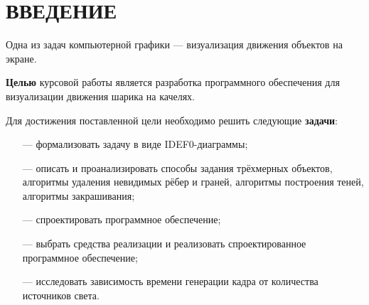 \chapter*{ВВЕДЕНИЕ}

\fontsize{16}{19}\selectfont

Одна из задач компьютерной графики --- визуализация движения объектов на экране.

\textbf{Целью} курсовой работы является разработка программного обеспечения для визуализации движения шарика на качелях.

Для достижения поставленной цели необходимо решить следующие \textbf{задачи}:

\begin{enumerate}
	\item[---] формализовать задачу в виде IDEF0-диаграммы;
	\item[---] описать и проанализировать способы задания трёхмерных объектов, алгоритмы удаления невидимых рёбер и граней, алгоритмы построения теней, алгоритмы закрашивания;
	\item[---] спроектировать программное обеспечение;
	\item[---] выбрать средства реализации и реализовать спроектированное программное обеспечение; 
	\item[---] исследовать зависимость времени генерации кадра от количества источников света.
\end{enumerate}

\pagebreak
